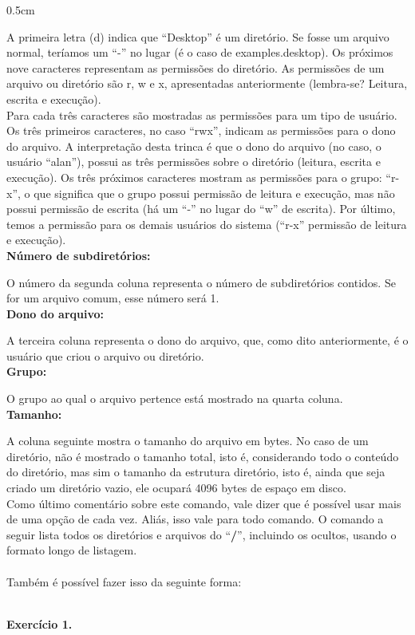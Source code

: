 \begin{refsection}
\begin {myindentpar}{0.5cm}
\begin{enumerate}[\itshape i.]
 A primeira letra (d) indica que ``Desktop'' é um diretório. Se fosse um arquivo normal, teríamos um ``-'' no lugar (é o caso de examples.desktop). Os próximos nove caracteres representam as permissões do diretório. As permissões de um arquivo ou diretório são r, w e x, apresentadas anteriormente (lembra-se? Leitura, escrita e execução).\\
Para cada três caracteres são mostradas as permissões para um tipo de usuário. Os três primeiros caracteres, no caso ``rwx'', indicam as permissões para o dono do arquivo. A interpretação desta trinca é que o dono do arquivo (no caso, o usuário ``alan''), possui as três permissões sobre o diretório (leitura, escrita e execução). Os três próximos caracteres mostram as permissões para o grupo: ``r-x'', o que significa que o grupo possui permissão de leitura e execução, mas não possui permissão de escrita (há um ``-'' no lugar do ``w'' de escrita). Por último, temos a permissão para os demais usuários do sistema (``r-x'' permissão de leitura e execução).\\

 \textbf{Número de subdiretórios:}

O número da segunda coluna representa o número de subdiretórios contidos. Se for um arquivo comum, esse número será 1.\\

 \textbf{Dono do arquivo:}

A terceira coluna representa o dono do arquivo, que, como dito anteriormente, é o usuário que criou o arquivo ou diretório.\\

 \textbf{Grupo:}

O grupo ao qual o arquivo pertence está mostrado na quarta coluna.\\

 \textbf{Tamanho:}

A coluna seguinte mostra o tamanho do arquivo em bytes. No caso de um diretório, não é mostrado o tamanho total, isto é, considerando todo o conteúdo do diretório, mas sim o tamanho da estrutura diretório, isto é, ainda que seja criado um diretório vazio, ele ocupará 4096 bytes de espaço em disco.\\
Como último comentário sobre este comando, vale dizer que é possível usar mais de uma opção de cada vez. Aliás, isso vale para todo comando. O comando a seguir lista todos os diretórios e arquivos do ``\textbf{/}'', incluindo os ocultos, usando o formato longo de listagem.
\\
 \\
 Também é possível fazer isso da seguinte forma:\\
\\
\begin{blackBlock}{\textbf{Exercício 1.}}\label{tut1:ex:1.\arabic{ex}}


\end{blackBlock}
\end{enumerate}
\end{myindentpar}
\end{refsection}
